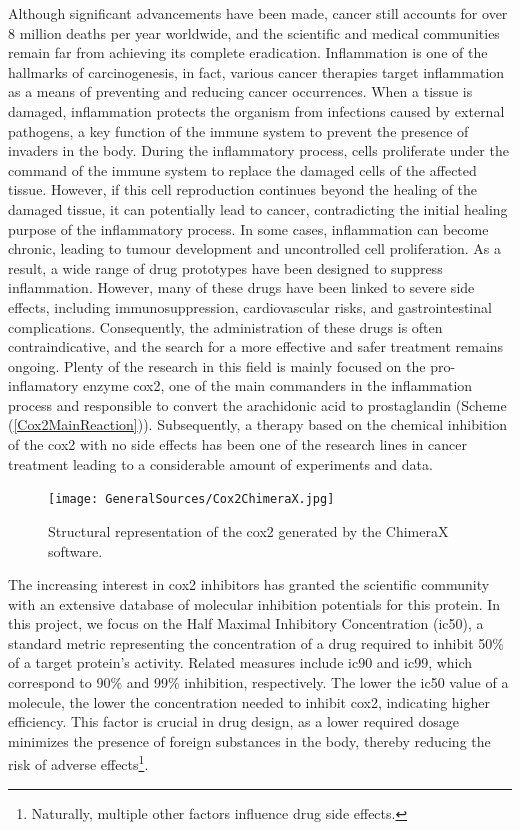 \documentclass[11pt]{article}
\begin{document}
Although significant advancements have been made, cancer still accounts for over 8 million deaths per year worldwide, and the scientific and medical communities remain far from achieving its complete eradication. Inflammation is one of the hallmarks of carcinogenesis, in fact, various cancer therapies target inflammation as a means of preventing and reducing cancer occurrences. When a tissue is damaged, inflammation protects the organism from infections caused by external pathogens, a key function of the immune system to prevent the presence of invaders in the body. During the inflammatory process, cells proliferate under the command of the immune system to replace the damaged cells of the affected tissue. However, if this cell reproduction continues beyond the healing of the damaged tissue, it can potentially lead to cancer, contradicting the initial healing purpose of the inflammatory process. In some cases, inflammation can become chronic, leading to tumour development and uncontrolled cell proliferation. As a result, a wide range of drug prototypes have been designed to suppress inflammation. However, many of these drugs have been linked to severe side effects, including immunosuppression, cardiovascular risks, and gastrointestinal complications. Consequently, the administration of these drugs is often contraindicative, and the search for a more effective and safer treatment remains ongoing. Plenty of the research in this field is mainly focused on the pro-inflamatory enzyme \gls{cox2}, one of the main commanders in the inflammation process and responsible to convert the arachidonic acid to prostaglandin  (Scheme (\ref{Cox2MainReaction})). Subsequently, a therapy based on the chemical inhibition of the \gls{cox2} with no side effects has been one of the research lines in cancer treatment leading to a considerable amount of experiments and data.
\begin{figure}[t]
	\centering
	\texttt{[image: GeneralSources/Cox2ChimeraX.jpg]}
	\caption{Structural representation of the \gls{cox2} generated by the ChimeraX software\cite{ChimeraX}.}
	\label{FigureCox2ChimeraX}
\end{figure}

The increasing interest in \gls{cox2} inhibitors has granted the scientific community with an extensive database of molecular inhibition potentials for this protein. In this project, we focus on the Half Maximal Inhibitory Concentration (\gls{ic50}), a standard metric representing the concentration of a drug required to inhibit 50\% of a target protein’s activity. Related measures include \gls{ic90} and \gls{ic99}, which correspond to 90\% and 99\% inhibition, respectively. The lower the \gls{ic50} value of a molecule, the lower the concentration needed to inhibit \gls{cox2}, indicating higher efficiency. This factor is crucial in drug design, as a lower required dosage minimizes the presence of foreign substances in the body, thereby reducing the risk of adverse effects\footnote{Naturally, multiple other factors influence drug side effects.}.
\end{document}
